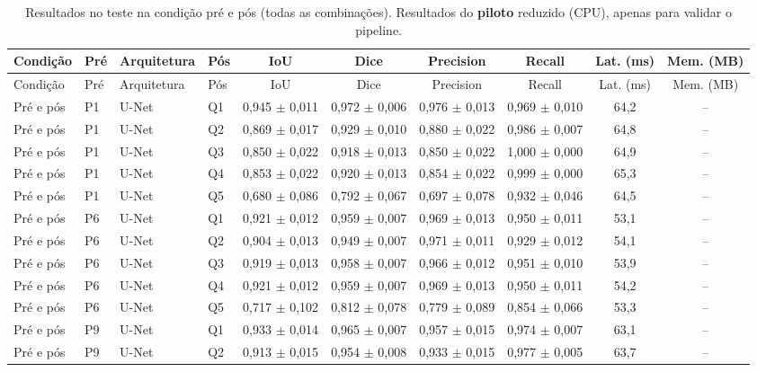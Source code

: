 {\scriptsize\setlength{\tabcolsep}{2.5pt}
\begin{longtable}{llllcccccc}
\caption{Resultados no teste na condição pré e pós (todas as combinações). Resultados do \textbf{piloto} reduzido (CPU), apenas para validar o pipeline.}\label{tab:condicao4}\\
\toprule
Condição & Pré & Arquitetura & Pós & IoU & Dice & Precision & Recall & Lat. (ms) & Mem. (MB) \\
\midrule
\endfirsthead
\toprule
Condição & Pré & Arquitetura & Pós & IoU & Dice & Precision & Recall & Lat. (ms) & Mem. (MB) \\
\midrule
\endhead
\bottomrule
\endfoot
Pré e pós & P1 & U-Net & Q1 & 0,945 $\pm$ 0,011 & 0,972 $\pm$ 0,006 & 0,976 $\pm$ 0,013 & 0,969 $\pm$ 0,010 & 64,2 & -- \\
Pré e pós & P1 & U-Net & Q2 & 0,869 $\pm$ 0,017 & 0,929 $\pm$ 0,010 & 0,880 $\pm$ 0,022 & 0,986 $\pm$ 0,007 & 64,8 & -- \\
Pré e pós & P1 & U-Net & Q3 & 0,850 $\pm$ 0,022 & 0,918 $\pm$ 0,013 & 0,850 $\pm$ 0,022 & 1,000 $\pm$ 0,000 & 64,9 & -- \\
Pré e pós & P1 & U-Net & Q4 & 0,853 $\pm$ 0,022 & 0,920 $\pm$ 0,013 & 0,854 $\pm$ 0,022 & 0,999 $\pm$ 0,000 & 65,3 & -- \\
Pré e pós & P1 & U-Net & Q5 & 0,680 $\pm$ 0,086 & 0,792 $\pm$ 0,067 & 0,697 $\pm$ 0,078 & 0,932 $\pm$ 0,046 & 64,5 & -- \\
Pré e pós & P6 & U-Net & Q1 & 0,921 $\pm$ 0,012 & 0,959 $\pm$ 0,007 & 0,969 $\pm$ 0,013 & 0,950 $\pm$ 0,011 & 53,1 & -- \\
Pré e pós & P6 & U-Net & Q2 & 0,904 $\pm$ 0,013 & 0,949 $\pm$ 0,007 & 0,971 $\pm$ 0,011 & 0,929 $\pm$ 0,012 & 54,1 & -- \\
Pré e pós & P6 & U-Net & Q3 & 0,919 $\pm$ 0,013 & 0,958 $\pm$ 0,007 & 0,966 $\pm$ 0,012 & 0,951 $\pm$ 0,010 & 53,9 & -- \\
Pré e pós & P6 & U-Net & Q4 & 0,921 $\pm$ 0,012 & 0,959 $\pm$ 0,007 & 0,969 $\pm$ 0,013 & 0,950 $\pm$ 0,011 & 54,2 & -- \\
Pré e pós & P6 & U-Net & Q5 & 0,717 $\pm$ 0,102 & 0,812 $\pm$ 0,078 & 0,779 $\pm$ 0,089 & 0,854 $\pm$ 0,066 & 53,3 & -- \\
Pré e pós & P9 & U-Net & Q1 & 0,933 $\pm$ 0,014 & 0,965 $\pm$ 0,007 & 0,957 $\pm$ 0,015 & 0,974 $\pm$ 0,007 & 63,1 & -- \\
Pré e pós & P9 & U-Net & Q2 & 0,913 $\pm$ 0,015 & 0,954 $\pm$ 0,008 & 0,933 $\pm$ 0,015 & 0,977 $\pm$ 0,005 & 63,7 & -- \\

\end{longtable}}
